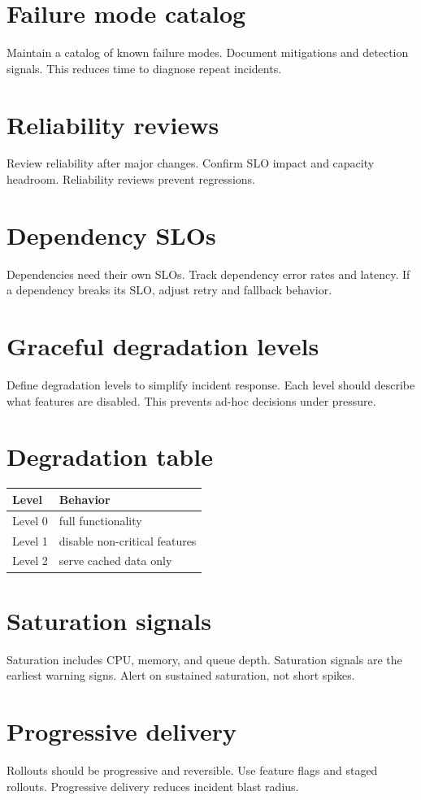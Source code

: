 \section{Failure mode catalog}
Maintain a catalog of known failure modes.
Document mitigations and detection signals.
This reduces time to diagnose repeat incidents.

\section{Reliability reviews}
Review reliability after major changes.
Confirm SLO impact and capacity headroom.
Reliability reviews prevent regressions.

\section{Dependency SLOs}
Dependencies need their own SLOs.
Track dependency error rates and latency.
If a dependency breaks its SLO, adjust retry and fallback behavior.

\section{Graceful degradation levels}
Define degradation levels to simplify incident response.
Each level should describe what features are disabled.
This prevents ad-hoc decisions under pressure.

\section{Degradation table}
\begin{tabularx}{\textwidth}{@{}lX@{}}
\toprule
Level & Behavior \\
\midrule
Level 0 & full functionality \\
Level 1 & disable non-critical features \\
Level 2 & serve cached data only \\
\bottomrule
\end{tabularx}

\section{Saturation signals}
Saturation includes CPU, memory, and queue depth.
Saturation signals are the earliest warning signs.
Alert on sustained saturation, not short spikes.

\section{Progressive delivery}
Rollouts should be progressive and reversible.
Use feature flags and staged rollouts.
Progressive delivery reduces incident blast radius.

